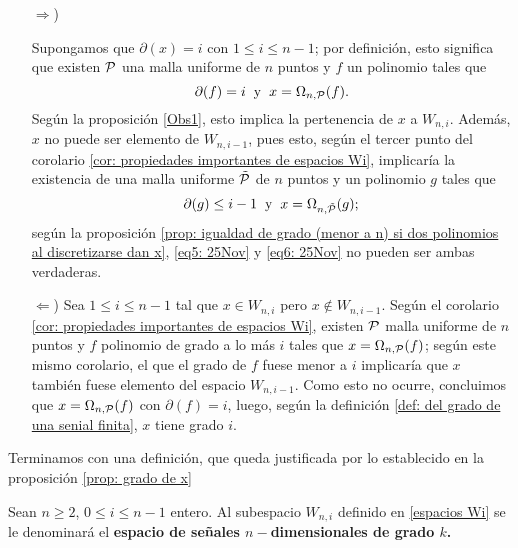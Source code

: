 \begin{itemize}
\item [$\Rightarrow$)]

Supongamos que $\partial(x)=i$ con $1 \leq i \leq n-1$;
por definición, esto significa que existen
$\mathcal{P}$ una malla uniforme de $n$ puntos y $f$ un 
polinomio 
tales que 
\begin{equation}
\label{eq5: 25Nov}
\partial(f)=i \hspace{0.2cm} \text{y} \hspace{0.2cm}
x=\Omega_{n,\mathcal{P}}(f).
\end{equation}
Según la proposición 
\ref{Obs1},
esto implica la pertenencia de $x$ a $W_{n,i}$.
Además, $x$ no puede ser elemento de $W_{n,i-1}$,
pues esto,
según el tercer punto del corolario
\ref{cor: propiedades importantes de espacios Wi},
implicaría la existencia de una
malla uniforme $\tilde{\mathcal{P}}$ de $n$
puntos y un polinomio $g$ tales que
\begin{equation}
\label{eq6: 25Nov}
\partial(g)\leq i-1 \hspace{0.2cm} \text{y} \hspace{0.2cm}
x=\Omega_{n,\tilde{\mathcal{P}}}(g);
\end{equation}
según la proposición
\ref{prop: igualdad de grado (menor a n) si dos polinomios al discretizarse dan x}, \eqref{eq5: 25Nov}
y \eqref{eq6: 25Nov} no pueden ser ambas verdaderas.

\item[$\Leftarrow$)] Sea
$1 \leq i \leq n-1$ tal que $x \in W_{n,i}$
pero $x \not\in W_{n,i-1}$.
Según el corolario
\ref{cor: propiedades importantes de espacios Wi}, existen
$\mathcal{P}$ malla uniforme de $n$ puntos y
$f$ polinomio de grado a lo más $i$ tales que
$x= \Omega_{n, \mathcal{P}}(f)$; según este mismo
corolario, el que el grado de $f$ fuese menor a $i$
implicaría que $x$ también fuese elemento
del espacio $W_{n,i-1}$. Como esto no ocurre, concluimos
que $x= \Omega_{n, \mathcal{P}}(f)$
con $\partial(f)=i$, luego, según la definición
\ref{def: del grado de una senial finita}, 
$x$ tiene grado $i$.
\end{itemize}
\QEDB
\vspace{0.2cm}

Terminamos con una definición, que queda justificada
por lo establecido en la proposición \ref{prop: grado de x}

\begin{defi}
Sean $n \geq 2$, $0 \leq i \leq n-1$ entero. 
Al subespacio $W_{n,i}$ definido en \eqref{espacios Wi}
se le denominará el \textbf{espacio de señales $n-$dimensionales
de grado $k$.}
\end{defi}



